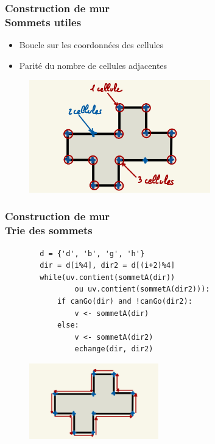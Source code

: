 \documentclass{beamer}
\begin{document}
\begin{frame}
    \frametitle{Construction de mur \\
                \small Sommets utiles}
    \begin{block}{}
        \begin{itemize}
            \item Boucle sur les coordonnées des cellules
            \item Parité du nombre de cellules adjacentes
        \end{itemize}
    \end{block}
    \begin{figure}
        \centering
        \includegraphics[width=0.7\textwidth]{images/sommets_utiles.jpg}
    \end{figure}
\end{frame}

\begin{frame}[fragile]
    \frametitle{Construction de mur \\
                \small Trie des sommets}
    \vspace*{-0.5cm}
    \begin{minipage}[t][4cm][t]{\textwidth}
        \small\begin{lstlisting}
        d = {'d', 'b', 'g', 'h'}
        dir = d[i%4], dir2 = d[(i+2)%4]
        while(uv.contient(sommetA(dir)) 
                ou uv.contient(sommetA(dir2))):
            if canGo(dir) and !canGo(dir2):
                v <- sommetA(dir)
            else:
                v <- sommetA(dir2)
                echange(dir, dir2)
        \end{lstlisting}
    \end{minipage}
    \begin{figure}
        \centering
        \includegraphics[width=0.5\textwidth]{images/tri_sommet.jpg}
    \end{figure}
\end{frame}
\end{document}
